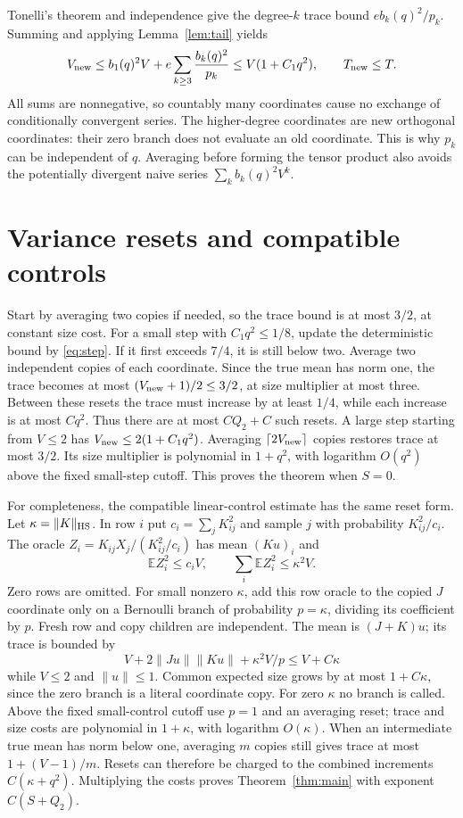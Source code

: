 \documentclass[11pt]{article}
\newcommand{\E}{\mathbb E}
\newcommand{\norm}[1]{\lVert #1\rVert}
\begin{document}
Tonelli's theorem and independence give the degree-$k$ trace bound
$e b_k(q)^2/p_k$. Summing and applying Lemma~\ref{lem:tail} yields
\begin{equation}\label{eq:step}
 V_{\rm new}\le b_1(q)^2V+
 e\sum_{k\ge3}\frac{b_k(q)^2}{p_k}
 \le V(1+C_1q^2),\qquad T_{\rm new}\le T.
\end{equation}
All sums are nonnegative, so countably many coordinates cause no exchange
of conditionally convergent series. The higher-degree coordinates are
new orthogonal coordinates: their zero branch does not evaluate an old
coordinate. This is why $p_k$ can be independent of $q$. Averaging before
forming the tensor product also avoids the potentially divergent naive
series $\sum_k b_k(q)^2V^k$.

\section{Variance resets and compatible controls}

Start by averaging two copies if needed, so the trace bound is at most
$3/2$, at constant size cost. For a small step with $C_1q^2\le1/8$,
update the deterministic bound by \eqref{eq:step}. If it first exceeds
$7/4$, it is still below two. Average two independent copies of each
coordinate. Since the true mean has norm one, the trace becomes at most
$(V_{\rm new}+1)/2\le3/2$, at size multiplier at most three.
Between these resets the trace must increase by at least $1/4$, while
each increase is at most $Cq^2$. Thus there are at most $C Q_2+C$ such
resets. A large step starting from $V\le2$ has
$V_{\rm new}\le2(1+C_1q^2)$. Averaging
$\lceil2V_{\rm new}\rceil$ copies restores trace at most $3/2$.
Its size multiplier is polynomial in $1+q^2$, with logarithm $O(q^2)$
above the fixed small-step cutoff. This proves the theorem when $S=0$.

For completeness, the compatible linear-control estimate has the same
reset form. Let $\kappa=\norm K_{\rm HS}$. In row $i$ put
$c_i=\sum_jK_{ij}^2$ and sample $j$ with probability $K_{ij}^2/c_i$.
The oracle $Z_i=K_{ij}X_j/(K_{ij}^2/c_i)$ has mean $(Ku)_i$ and
\[
 \E Z_i^2\le c_iV,\qquad \sum_i\E Z_i^2\le\kappa^2V.
\]
Zero rows are omitted. For small nonzero $\kappa$, add this row oracle
to the copied $J$ coordinate only on a Bernoulli branch of probability
$p=\kappa$, dividing its coefficient by $p$. Fresh row and copy children
are independent. The mean is $(J+K)u$; its trace is bounded by
\[
 V+2\norm{Ju}\norm{Ku}+\kappa^2V/p\le V+C\kappa
\]
while $V\le2$ and $\norm u\le1$. Common expected size grows by at most
$1+C\kappa$, since the zero branch is a literal coordinate copy.
For zero $\kappa$ no branch is called. Above the fixed small-control
cutoff use $p=1$ and an averaging reset; trace and size costs are
polynomial in $1+\kappa$, with logarithm $O(\kappa)$.
When an intermediate true mean has norm below one, averaging $m$ copies
still gives trace at most $1+(V-1)/m$. Resets can therefore be charged
to the combined increments $C(\kappa+q^2)$. Multiplying the costs proves
Theorem~\ref{thm:main} with exponent $C(S+Q_2)$.
\end{document}
